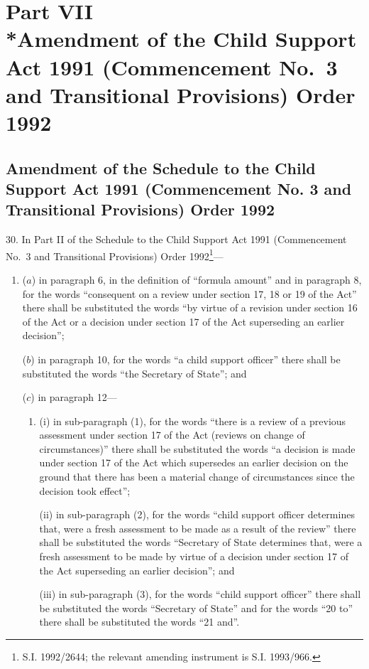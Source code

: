 \documentclass[12pt,a4paper]{article}
\begin{document}
\section[Part VII --- Amendment of the Child Support Act 1991 (Commencement No.\ 3 and Transitional Provisions) Order 1992]{Part VII\\*Amendment of the Child Support Act 1991 (Commencement No.\ 3 and Transitional Provisions) Order 1992}

\renewcommand\parthead{--- Part VII}

\subsection[30. Amendment of the Schedule to the Child Support Act 1991 (Commencement No. 3 and Transitional Provisions) Order 1992]{Amendment of the Schedule to the Child Support Act 1991 (Commencement No. 3 and Transitional Provisions) Order 1992}

30.  In Part II of the Schedule to the Child Support Act 1991 (Commencement No.\ 3 and Transitional Provisions) Order 1992\footnote{\frenchspacing S.I. 1992/2644; the relevant amending instrument is S.I. 1993/966.}—
\begin{enumerate}\item[]
($a$) in paragraph 6, in the definition of “formula amount” and in paragraph 8, for the words “consequent on a review under section 17, 18 or 19 of the Act” there shall be substituted the words “by virtue of a revision under section 16 of the Act or a decision under section 17 of the Act superseding an earlier decision”;

($b$) in paragraph 10, for the words “a child support officer” there shall be substituted the words “the Secretary of State”; and

($c$) in paragraph 12—
\begin{enumerate}\item[]
(i) in sub-paragraph (1), for the words “there is a review of a previous assessment under section 17 of the Act (reviews on change of circumstances)” there shall be substituted the words “a decision is made under section 17 of the Act which supersedes an earlier decision on the ground that there has been a material change of circumstances since the decision took effect”;

(ii) in sub-paragraph (2), for the words “child support officer determines that, were a fresh assessment to be made as a result of the review” there shall be substituted the words “Secretary of State determines that, were a fresh assessment to be made by virtue of a decision under section 17 of the Act superseding an earlier decision”; and

(iii) in sub-paragraph (3), for the words “child support officer” there shall be substituted the words “Secretary of State” and for the words “20 to” there shall be substituted the words “21 and”.
\end{enumerate}
\end{enumerate}
\end{document}
